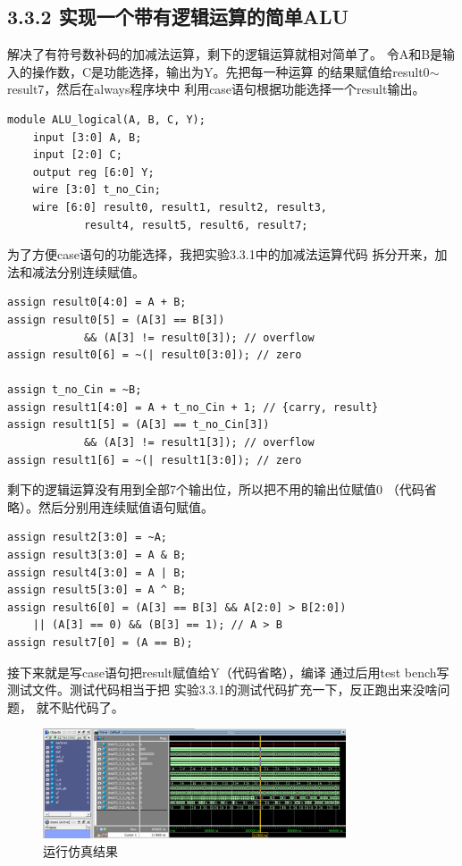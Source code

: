 \documentclass[12pt,a4paper,UTF8]{article}
\begin{document}
\subsection{3.3.2 实现一个带有逻辑运算的简单ALU}
解决了有符号数补码的加减法运算，剩下的逻辑运算就相对简单了。
令A和B是输入的操作数，C是功能选择，输出为Y。先把每一种运算
的结果赋值给result0$\sim$result7，然后在always程序块中
利用case语句根据功能选择一个result输出。
\begin{lstlisting}[style=verilog-style]
module ALU_logical(A, B, C, Y);
	input [3:0] A, B;
	input [2:0] C;
	output reg [6:0] Y;
	wire [3:0] t_no_Cin;
	wire [6:0] result0, result1, result2, result3,
			result4, result5, result6, result7;
\end{lstlisting}
为了方便case语句的功能选择，我把实验3.3.1中的加减法运算代码
拆分开来，加法和减法分别连续赋值。
\begin{lstlisting}[style=verilog-style]
assign result0[4:0] = A + B;
assign result0[5] = (A[3] == B[3]) 
            && (A[3] != result0[3]); // overflow
assign result0[6] = ~(| result0[3:0]); // zero 

assign t_no_Cin = ~B;
assign result1[4:0] = A + t_no_Cin + 1; // {carry, result}
assign result1[5] = (A[3] == t_no_Cin[3]) 
            && (A[3] != result1[3]); // overflow
assign result1[6] = ~(| result1[3:0]); // zero
\end{lstlisting}
剩下的逻辑运算没有用到全部7个输出位，所以把不用的输出位赋值0
（代码省略）。然后分别用连续赋值语句赋值。
\begin{lstlisting}[style=verilog-style]
assign result2[3:0] = ~A;
assign result3[3:0] = A & B;
assign result4[3:0] = A | B;
assign result5[3:0] = A ^ B;
assign result6[0] = (A[3] == B[3] && A[2:0] > B[2:0]) 
	|| (A[3] == 0) && (B[3] == 1); // A > B
assign result7[0] = (A == B);
\end{lstlisting}
接下来就是写case语句把result赋值给Y（代码省略），编译
通过后用test bench写测试文件。测试代码相当于把
实验3.3.1的测试代码扩充一下，反正跑出来没啥问题，
就不贴代码了。
\begin{figure}[H]
  \centering
  \includegraphics[width=0.8\textwidth]{03_3_2sim.JPG}
  \caption{运行仿真结果}
  \label{sim}
\end{figure}
\end{document}
